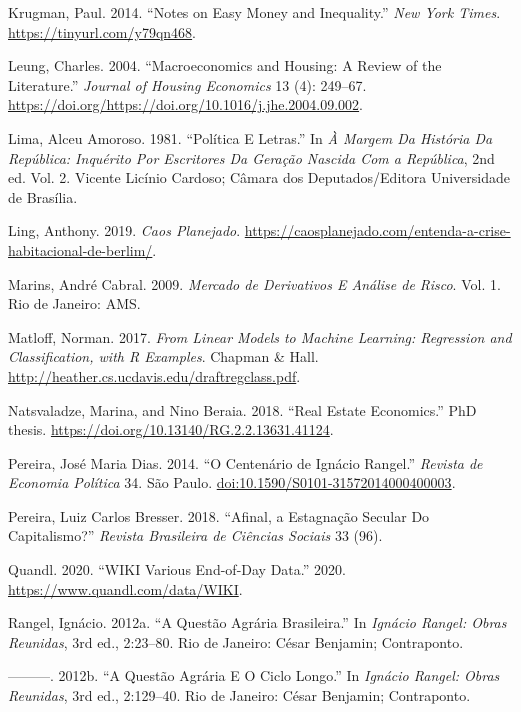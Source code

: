 \documentclass[
	12pt,				%
	oneside,			%
	a4paper,			%
	chapter=TITLE,		%
	section=TITLE,		%
	english,			%
	brazil				%
	]{abntex2}
\begin{document}
\leavevmode\hypertarget{ref-krugman}{}%
Krugman, Paul. 2014. ``Notes on Easy Money and Inequality.'' \emph{New York Times}. \url{https://tinyurl.com/y79qn468}.

\leavevmode\hypertarget{ref-LEUNG}{}%
Leung, Charles. 2004. ``Macroeconomics and Housing: A Review of the Literature.'' \emph{Journal of Housing Economics} 13 (4): 249--67. \url{https://doi.org/https://doi.org/10.1016/j.jhe.2004.09.002}.

\leavevmode\hypertarget{ref-amoroso}{}%
Lima, Alceu Amoroso. 1981. ``Política E Letras.'' In \emph{À Margem Da História Da República: Inquérito Por Escritores Da Geração Nascida Com a República}, 2nd ed. Vol. 2. Vicente Licínio Cardoso; Câmara dos Deputados/Editora Universidade de Brasília.

\leavevmode\hypertarget{ref-berlim}{}%
Ling, Anthony. 2019. \emph{Caos Planejado}. \url{https://caosplanejado.com/entenda-a-crise-habitacional-de-berlim/}.

\leavevmode\hypertarget{ref-marins1}{}%
Marins, André Cabral. 2009. \emph{Mercado de Derivativos E Análise de Risco}. Vol. 1. Rio de Janeiro: AMS.

\leavevmode\hypertarget{ref-matloff2017}{}%
Matloff, Norman. 2017. \emph{From Linear Models to Machine Learning: Regression and Classification, with R Examples}. Chapman \& Hall. \url{http://heather.cs.ucdavis.edu/draftregclass.pdf}.

\leavevmode\hypertarget{ref-realestate}{}%
Natsvaladze, Marina, and Nino Beraia. 2018. ``Real Estate Economics.'' PhD thesis. \url{https://doi.org/10.13140/RG.2.2.13631.41124}.

\leavevmode\hypertarget{ref-pereira}{}%
Pereira, José Maria Dias. 2014. ``O Centenário de Ignácio Rangel.'' \emph{Revista de Economia Política} 34. São Paulo. \url{doi:10.1590/S0101-31572014000400003}.

\leavevmode\hypertarget{ref-bresser2018}{}%
Pereira, Luiz Carlos Bresser. 2018. ``Afinal, a Estagnação Secular Do Capitalismo?'' \emph{Revista Brasileira de Ciências Sociais} 33 (96).

\leavevmode\hypertarget{ref-QuandlWIKI}{}%
Quandl. 2020. ``WIKI Various End-of-Day Data.'' 2020. \url{https://www.quandl.com/data/WIKI}.

\leavevmode\hypertarget{ref-rangel1962}{}%
Rangel, Ignácio. 2012a. ``A Questão Agrária Brasileira.'' In \emph{Ignácio Rangel: Obras Reunidas}, 3rd ed., 2:23--80. Rio de Janeiro: César Benjamin; Contraponto.

\leavevmode\hypertarget{ref-rangel1986b}{}%
---------. 2012b. ``A Questão Agrária E O Ciclo Longo.'' In \emph{Ignácio Rangel: Obras Reunidas}, 3rd ed., 2:129--40. Rio de Janeiro: César Benjamin; Contraponto.
\end{document}
